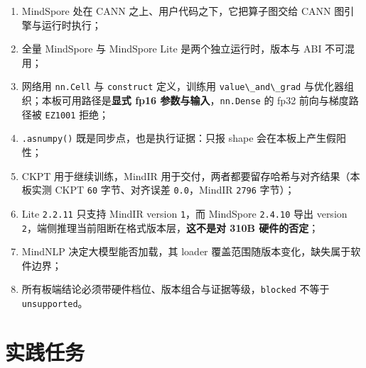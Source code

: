 \begin{enumerate}
\def\labelenumi{\arabic{enumi}.}
\tightlist
\item
  MindSpore 处在 CANN 之上、用户代码之下，它把算子图交给 CANN
  图引擎与运行时执行；
\item
  全量 MindSpore 与 MindSpore Lite 是两个独立运行时，版本与 ABI
  不可混用；
\item
  网络用 \passthrough{\lstinline!nn.Cell!} 与
  \passthrough{\lstinline!construct!} 定义，训练用
  \passthrough{\lstinline!value\_and\_grad!}
  与优化器组织；本板可用路径是\textbf{显式 fp16
  参数与输入}，\passthrough{\lstinline!nn.Dense!} 的 fp32
  前向与梯度路径被 \passthrough{\lstinline!EZ1001!} 拒绝；
\item
  \passthrough{\lstinline!.asnumpy()!} 既是同步点，也是执行证据：只报
  shape 会在本板上产生假阳性；
\item
  CKPT 用于继续训练，MindIR
  用于交付，两者都要留存哈希与对齐结果（本板实测 CKPT
  \passthrough{\lstinline!60!} 字节、对齐误差
  \passthrough{\lstinline!0.0!}，MindIR \passthrough{\lstinline!2796!}
  字节）；
\item
  Lite \passthrough{\lstinline!2.2.11!} 只支持 MindIR version
  \passthrough{\lstinline!1!}，而 MindSpore
  \passthrough{\lstinline!2.4.10!} 导出 version
  \passthrough{\lstinline!2!}，端侧推理当前阻断在格式版本层，\textbf{这不是对
  310B 硬件的否定}；
\item
  MindNLP 决定大模型能否加载，其 loader
  覆盖范围随版本变化，缺失属于软件边界；
\item
  所有板端结论必须带硬件档位、版本组合与证据等级，\passthrough{\lstinline!blocked!}
  不等于 \passthrough{\lstinline!unsupported!}。
\end{enumerate}

\section{实践任务}\label{src-book-chapter5-h36}

